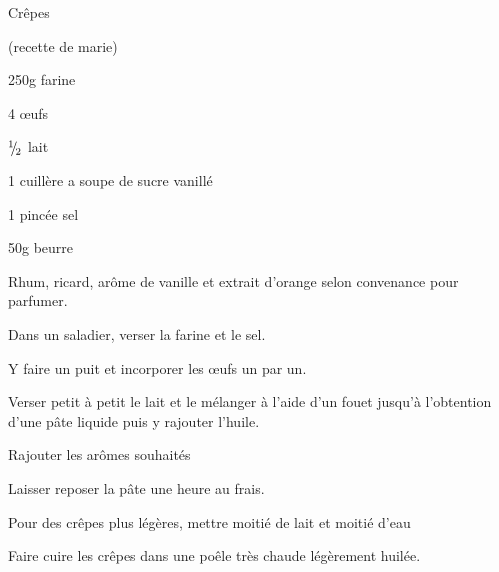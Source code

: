 \begin{recette}{Crêpes}

(recette de marie)

\begin{ingredients}
\item 250g farine
\item 4 œufs
\item ${{}^{1\!\!}/ _{\!2}}$ lait
\item 1 cuillère a soupe de sucre vanillé
\item 1 pincée sel
\item 50g beurre
\item Rhum, ricard, arôme de vanille et extrait d'orange selon convenance pour parfumer.
\end{ingredients}


\begin{preparation}
\item Dans un saladier, verser la farine et le sel.
\item Y faire un puit et incorporer les œufs un par un.
\item Verser petit à petit le lait et le mélanger à l'aide d'un fouet jusqu'à l'obtention d'une pâte liquide puis y rajouter l'huile.
\item Rajouter les arômes souhaités
\item Laisser reposer la pâte une heure au frais.
\end{preparation}

\begin{remarque}
Pour des crêpes plus légères, mettre moitié de lait et moitié d'eau
\end{remarque}

\begin{cuisson}
Faire cuire les crêpes dans une poêle très chaude légèrement huilée.
\end{cuisson}
\end{recette}

